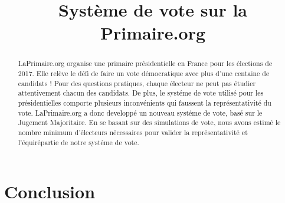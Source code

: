 \documentclass[conference]{IEEEtran}
\title{Syst\`eme de vote sur la Primaire.org}
\author{
    \IEEEauthorblockN{Pierre-Louis Guhur, Thibauld Favre}
}
\newcommand*{\rootPath}{./}
\begin{document}
  
  
\maketitle


\begin{abstract} %
LaPrimaire.org organise une primaire pr\'esidentielle en France pour les \'elections de 2017. Elle rel\`eve le d\'efi de faire un vote d\'emocratique avec plus d'une centaine de candidats ! Pour des questions pratiques, chaque \'electeur ne peut pas \'etudier attentivement chacun des candidats. De plus, le syst\'eme de vote utilis\'e pour les pr\'esidentielles comporte plusieurs inconv\'enients qui faussent la repr\'esentativit\'e du vote. LaPrimaire.org a donc developp\'e un nouveau syst\'eme de vote, bas\'e sur le Jugement Majoritaire. 
En se basant sur des simulations de vote, nous avons estim\'e le nombre minimum d'\'electeurs n\'ecessaires pour valider la repr\'esentativit\'e et l'\'equir\'epartie de  notre syst\'eme de vote. 
\end{abstract}











\section{Conclusion}





\ifstandalone
	
	
\fi
\end{document}

